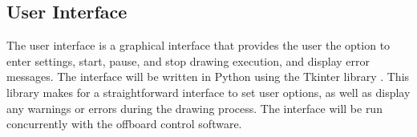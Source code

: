 
\subsection{User Interface}
\label{sec:software_ui}
The user interface is a graphical interface that provides the user the option to enter settings, start, pause, and stop drawing execution, and display error messages. The interface will be written in Python using the Tkinter library \cite{python_tkinter}. This library makes for a straightforward interface to set user options, as well as display any warnings or errors during the drawing process. The interface will be run concurrently with the offboard control software.